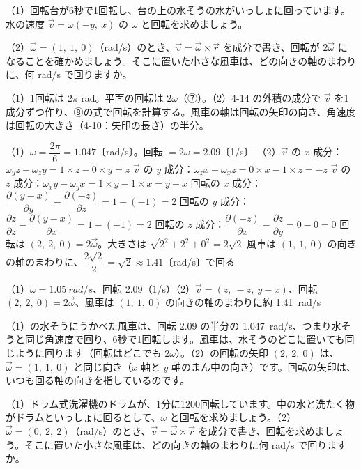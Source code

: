 \begin{reidai}[全体がいっしょに回る流れ]
（1）回転台が6秒で1回転し、台の上の水そうの水がいっしょに回っています。水の速度 $\vec v=\omega(-y,\ x)$ の $\omega$ と回転を求めましょう。\par
（2）$\vec\omega=(1,\ 1,\ 0)$（rad/s）のとき、$\vec v=\vec\omega\times\vec r$ を成分で書き、回転が $2\vec\omega$ になることを確かめましょう。そこに置いた小さな風車は、どの向きの軸のまわりに、何 rad/s で回りますか。\par
\kangaekata（1）1回転は $2\pi$ rad。平面の回転は $2\omega$（⑦）。（2）4-14 の外積の成分で $\vec v$ を1成分ずつ作り、⑧の式で回転を計算する。風車の軸は回転の矢印の向き、角速度は回転の大きさ（4-10：矢印の長さ）の半分。\par
\shiki（1）$\omega=\dfrac{2\pi}{6}=1.047$〔rad/s〕。回転 $=2\omega=2.09$〔1/s〕\kviiikq
（2）$\vec v$ の $x$ 成分：$\omega_yz-\omega_zy=1\times z-0\times y=z$\kviiikq
$\vec v$ の $y$ 成分：$\omega_zx-\omega_xz=0\times x-1\times z=-z$\kviiikq
$\vec v$ の $z$ 成分：$\omega_xy-\omega_yx=1\times y-1\times x=y-x$\kviiikq
回転の $x$ 成分：$\dfrac{\partial(y-x)}{\partial y}-\dfrac{\partial(-z)}{\partial z}=1-(-1)=2$\kviiikq
回転の $y$ 成分：$\dfrac{\partial z}{\partial z}-\dfrac{\partial(y-x)}{\partial x}=1-(-1)=2$\kviiikq
回転の $z$ 成分：$\dfrac{\partial(-z)}{\partial x}-\dfrac{\partial z}{\partial y}=0-0=0$\kviiikq
回転は $(2,\ 2,\ 0)=2\vec\omega$。大きさは $\sqrt{2^2+2^2+0^2}=2\sqrt2$\kviiikq
風車は $(1,\ 1,\ 0)$ の向きの軸のまわりに、$\dfrac{2\sqrt2}{2}=\sqrt2\approx1.41$〔rad/s〕で回る\par
\kotae（1）\nobreak $\omega=\qty{1.05}{rad/s}$、回転 2.09（1/s）\quad（2）\nobreak $\vec v=(z,\ -z,\ y-x)$、回転 $(2,\ 2,\ 0)=2\vec\omega$、風車は $(1,\ 1,\ 0)$ の向きの軸のまわりに約 \qty{1.41}{rad/s}
\end{reidai}
\noindent（1）の水そうにうかべた風車は、回転 2.09 の半分の \qty{1.047}{rad/s}、つまり水そうと同じ角速度で回り、6秒で1回転します。風車は、水そうのどこに置いても同じように回ります（回転はどこでも $2\omega$）。（2）の回転の矢印 $(2,\ 2,\ 0)$ は、$\vec\omega=(1,\ 1,\ 0)$ と同じ向き（$x$ 軸と $y$ 軸のまん中の向き）です。回転の矢印は、いつも回る軸の向きを指しているのです。

\begin{jibun}
（1）ドラム式洗濯機のドラムが、1分に1200回転しています。中の水と洗たく物がドラムといっしょに回るとして、$\omega$ と回転を求めましょう。（2）$\vec\omega=(0,\ 2,\ 2)$（rad/s）のとき、$\vec v=\vec\omega\times\vec r$ を成分で書き、回転を求めましょう。そこに置いた小さな風車は、どの向きの軸のまわりに何 rad/s で回りますか。
\end{jibun}

